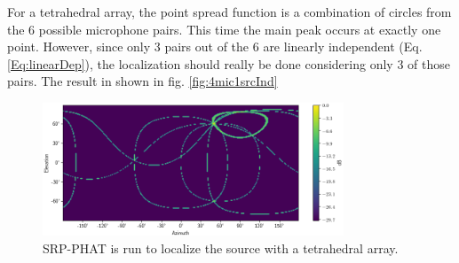 For a tetrahedral array, the point spread function is a combination of circles from the 6 possible microphone pairs. This time the main peak occurs at exactly one point. However, since only 3 pairs out of the 6 are linearly independent (Eq. \ref{Eq:linearDep}), the localization should really be done considering only 3 of those pairs. The result in shown in fig. \ref{fig:4mic1srcInd}
\begin{figure}[h]
    \centering
    \includegraphics[width=0.8\textwidth]{Figures/4mic1srcRes.png}
    \caption{SRP-PHAT is run to localize the source with a tetrahedral array.}
    \label{fig:4mic1src}
\end{figure}


